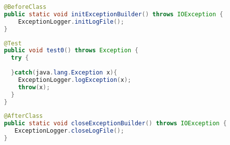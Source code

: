 
\begin{lstlisting}[language=java]
@BeforeClass
public static void initExceptionBuilder() throws IOException {
	ExceptionLogger.initLogFile();
}
\end{lstlisting}

\begin{lstlisting}[language=java]
@Test
public void test0() throws Exception {
  try {
  			
  }catch(java.lang.Exception x){
  	ExceptionLogger.logException(x);
  	throw(x);
  }
}
\end{lstlisting}

\begin{lstlisting}[language=java]
@AfterClass
public static void closeExceptionBuilder() throws IOException {
   ExceptionLogger.closeLogFile();
}
\end{lstlisting}

